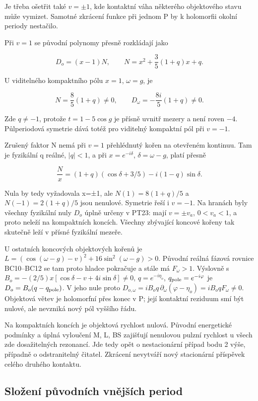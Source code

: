 \documentclass[11pt,a4paper]{article}
\theoremstyle{remark}\newtheorem{remark}[theorem]{Poznámka}
\numberwithin{equation}{section}
\begin{document}
Je třeba ošetřit také \(v=\pm1\), kde kontaktní váha některého
objektového stavu může vymizet. Samotné zkrácení funkce při jednom P by
k holomorfii okolní periody nestačilo.

Při \(v=1\) se původní polynomy přesně rozkládají jako

\[
D_o=(x-1)N,\qquad
N=x^2+\frac35(1+q)x+q.
\tag{HC9}
\]

U viditelného kompaktního pólu \(x=1\), \(\omega=g\), je

\[
N=\frac85(1+q)\ne0,\qquad
D_\omega=-\frac{8i}{5}(1+q)\ne0.
\tag{HC10}
\]

Zde \(q\ne-1\), protože \(t=1-5\cos g\) je přísně uvnitř mezery a není
roven \(-4\). Půlperiodová symetrie dává totéž pro viditelný kompaktní
pól při \(v=-1\).

Zrušený faktor N nemá při \(v=1\) přehlédnutý kořen na otevřeném
kontinuu. Tam je fyzikální q reálné, \(|q|<1\), a při
\(x=e^{-i\delta}\), \(\delta=\omega-g\), platí přesně

\[
\frac Nx=(1+q)(\cos\delta+3/5)
-i(1-q)\sin\delta.
\]

Nula by tedy vyžadovala x=±1, ale \(N(1)=8(1+q)/5\) a \(N(-1)=2(1+q)/5\)
jsou nenulové. Symetrie řeší i \(v=-1\). Na hranách byly všechny
fyzikální nuly \(D_o\) úplně určeny v PT23: mají \(v=\pm v_a\),
\(0<v_a<1\), a proto neleží na kompaktních koncích. Všechny zbývající
koncové kořeny tak skutečně leží v přísné fyzikální mezeře.

U ostatních koncových objektových kořenů je
\(L=(\cos(\omega-g)-v)^2+16\sin^2(\omega-g)>0\). Původní reálná fázová
rovnice BC10--BC12 se tam proto hladce pokračuje a stále má
\(F_\omega>1\). Výslovně s
\(B_o=-(2/5)x[\cos\delta-v+4i\sin\delta]\ne0\), \(q=e^{-i\eta_o}\),
\(q_{\rm pole}=e^{-i\varphi}\) je \(D_o=B_o(q-q_{\rm pole})\). V jeho
nule proto
\(D_{o,\omega}=iB_oq\,\partial_\omega(\varphi-\eta_o) =iB_oq F_\omega\ne0\).
Objektová větev je holomorfní přes konec v P; její kontaktní reziduum
smí být nulové, ale nevzniká nový pól vyššího řádu.

Na kompaktních koncích je objektová rychlost nulová. Původní energetické
podmínky a úplná vyloučení M, L, BS zajišťují nenulovou pulzní rychlost
u všech zde dosažitelných rezonancí. Jde tedy opět o nestacionární
případ bodu 2 výše, případně o odstranitelný čitatel. Zkrácení nevytváří
nový stacionární příspěvek celého druhého kontaktu.

\hypertarget{sloux17eenuxed-pux16fvodnuxedch-vnux11bjux161uxedch-period}{%
\subsection{Složení původních vnějších
period}\label{sloux17eenuxed-pux16fvodnuxedch-vnux11bjux161uxedch-period}}
\end{document}
